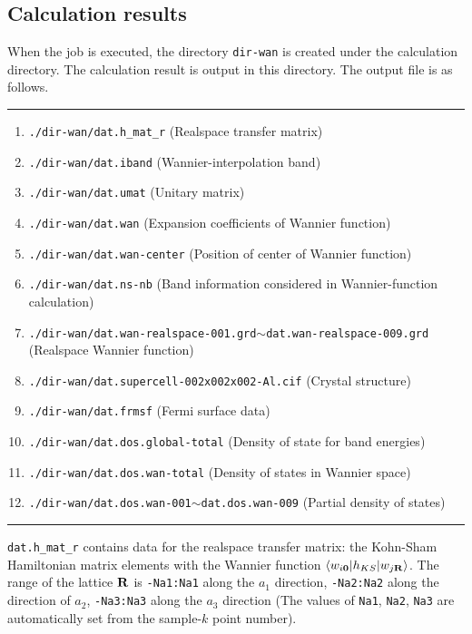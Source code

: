 \documentclass{article}
\begin{document}
\subsection{\label{result-wannier}Calculation results}
When the job is executed, the directory \verb+dir-wan+ is created under the calculation directory. The calculation result is output in this directory. The output file is as follows.
\vspace{3mm}\hrule
\begin{enumerate}
\item \verb+./dir-wan/dat.h_mat_r+ (Realspace transfer matrix)
\item \verb+./dir-wan/dat.iband+ (Wannier-interpolation band)
\item \verb+./dir-wan/dat.umat+ (Unitary matrix)
\item \verb+./dir-wan/dat.wan+ (Expansion coefficients of Wannier function)
\item \verb+./dir-wan/dat.wan-center+ (Position of center of Wannier function)
\item \verb+./dir-wan/dat.ns-nb+ (Band information considered in Wannier-function calculation)
\item {\tt ./dir-wan/dat.wan-realspace-001.grd}$\sim${\tt dat.wan-realspace-009.grd} (Realspace Wannier function)
\item {\tt ./dir-wan/dat.supercell-002x002x002-Al.cif} (Crystal structure)
\item \verb+./dir-wan/dat.frmsf+ (Fermi surface data)
\item {\tt ./dir-wan/dat.dos.global-total} (Density of state for band energies)
\item {\tt ./dir-wan/dat.dos.wan-total} (Density of states in Wannier space) 
\item {\tt ./dir-wan/dat.dos.wan-001}$\sim${\tt dat.dos.wan-009} (Partial density of states) 
\end{enumerate}
\hrule \vspace{3mm}

\verb+dat.h_mat_r+ contains data for the realspace transfer matrix: the Kohn-Sham Hamiltonian matrix elements with the Wannier function $\langle w_{i{\bf 0}}|h_{KS}|w_{j{\bf R}}\rangle$. The range of the lattice ${\bf R}$ is \verb+-Na1:Na1+ along the $a_1$ direction, \verb+-Na2:Na2+ along the direction of $a_2$, \verb+-Na3:Na3+ along the $a_3$ direction (The values of \verb+Na1+, \verb+Na2+, \verb+Na3+ are automatically set from the sample-$k$ point number).
\end{document}
